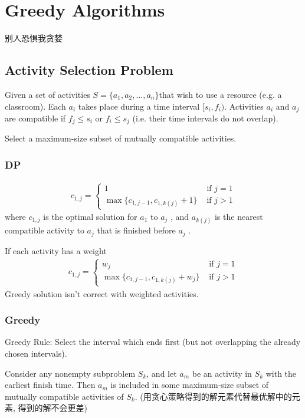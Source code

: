 \newpage
\section{Greedy Algorithms}
别人恐惧我贪婪

\subsection{Activity Selection Problem}
Given a set of activities $S = \{ a_1, a_2, \dots, a_n \}$that wish to use a resource (e.g. a classroom).  Each $a_i$ takes place during a time interval $[s_i, f_i)$. Activities $a_i$ and $a_j$ are compatible if $f_j\le s_i$ or $f_i\le s_j$ (i.e. their time intervals do not overlap).

Select a maximum-size subset of mutually compatible activities.


\subsubsection{DP}
\begin{align*}
    c_{1,j}=\left\{ \begin{array}{ll}
        1 & \text{ if }j=1\\
        \max\{ c_{1,j-1},c_{1, k(j)} +1 \} & \text{ if }j>1
    \end{array} \right.
\end{align*}
where $c_{1,j}$ is the optimal solution for $a_1$ to $a_j$ , and $a_{k(j)}$ is the nearest compatible activity to $a_j$  that is finished before $a_j$ .

If each activity has a weight
\begin{align*}
    c_{1,j}=\left\{ \begin{array}{ll}
        w_j & \text{ if }j=1\\
        \max\{ c_{1,j-1},c_{1, k(j)} +w_j \} & \text{ if }j>1
    \end{array} \right.
\end{align*}
Greedy solution isn't correct with weighted activities. 

\subsubsection{Greedy}
Greedy Rule: Select the interval which ends first (but not overlapping the already chosen intervals). 

\begin{theorem}
    Consider any nonempty subproblem $S_k$, and let $a_m$ be an activity in $S_k$ with the earliest finish time.  Then $a_m$ is included in some maximum-size subset of mutually compatible activities of $S_k$. (用贪心策略得到的解元素代替最优解中的元素, 得到的解不会更差)
\end{theorem}

